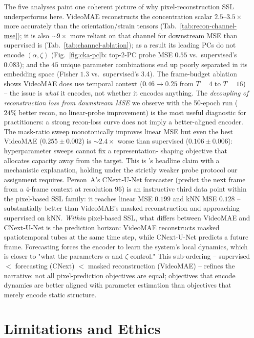 \documentclass{article}
\begin{document}
The five analyses paint one coherent picture of why pixel-reconstruction
SSL underperforms here. VideoMAE reconstructs the concentration scalar
$2.5$--$3.5{\times}$ more accurately than the orientation/strain tensors
(Tab.~\ref{tab:recon-channel-mse}); it is also $\sim$$9{\times}$ more
reliant on that channel for downstream MSE than supervised is
(Tab.~\ref{tab:channel-ablation}); as a result its leading PCs do not encode
$(\alpha,\zeta)$ (Fig.~\ref{fig:cka-pc}b: top-2-PC probe MSE $0.55$ vs.\
supervised's $0.083$); and the $45$ unique parameter combinations end up
poorly separated in its embedding space (Fisher $1.3$ vs.\ supervised's
$3.4$). The frame-budget ablation shows VideoMAE does use temporal context
($0.46\!\to\!0.25$ from $T\!=\!4$ to $T\!=\!16$) -- the issue is
\emph{what} it encodes, not whether it encodes anything. The
\emph{decoupling of reconstruction loss from downstream MSE} we observe
with the 50-epoch run ($24\%$ better recon, no linear-probe improvement) is
the most useful diagnostic for practitioners: a strong recon-loss curve
does not imply a better-aligned encoder. The mask-ratio sweep monotonically
improves linear MSE but even the best VideoMAE
($0.255\!\pm\!0.002$) is $\sim$$2.4{\times}$ worse than supervised
($0.106\!\pm\!0.006$): hyperparameter sweeps cannot fix a representation-
shaping objective that allocates capacity away from the target. This is
\citet{qu2026spatiotemporal}'s headline claim with a mechanistic
explanation, holding under the strictly weaker probe protocol our assignment
requires. Person~A's CNext-U-Net forecaster (predict the next frame from a
$4$-frame context at resolution $96$) is an instructive third data point
within the pixel-based SSL family: it reaches linear MSE $0.199$ and kNN MSE
$0.128$ -- substantially better than VideoMAE's masked reconstruction and
approaching supervised on kNN. \emph{Within} pixel-based SSL, what differs
between VideoMAE and CNext-U-Net is the prediction horizon: VideoMAE
reconstructs masked spatiotemporal tubes at the same time step, while
CNext-U-Net predicts a future frame. Forecasting forces the encoder to learn
the system's local dynamics, which is closer to "what the parameters $\alpha$
and $\zeta$ control." This sub-ordering -- supervised $<$ forecasting (CNext)
$<$ masked reconstruction (VideoMAE) -- refines the
\citet{qu2026spatiotemporal} narrative: not all pixel-prediction objectives
are equal; objectives that encode dynamics are better aligned with
parameter estimation than objectives that merely encode static structure.

\section{Limitations and Ethics}
\end{document}
